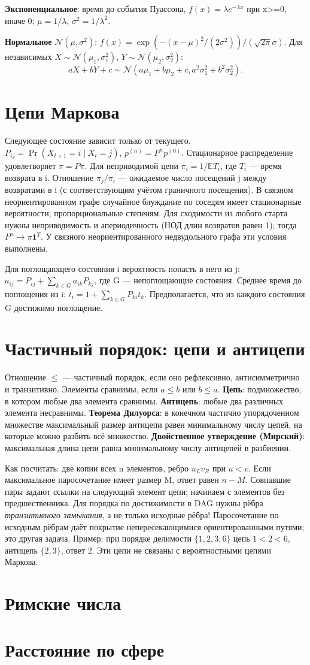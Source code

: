 \textbf{Экспоненциальное}: время до события Пуассона,
$f(x)=\lambda e^{-\lambda x}$ при x>=0, иначе 0;
$\mu=1/\lambda$, $\sigma^2=1/\lambda^2$.

\textbf{Нормальное} $\mathcal N(\mu,\sigma^2)$:
$f(x)=\exp(-(x-\mu)^2/(2\sigma^2))/(\sqrt{2\pi}\sigma)$.
Для независимых $X\sim\mathcal N(\mu_1,\sigma_1^2)$,
$Y\sim\mathcal N(\mu_2,\sigma_2^2)$:
\[aX+bY+c\sim\mathcal N(a\mu_1+b\mu_2+c,a^2\sigma_1^2+b^2\sigma_2^2).\]
\section{Цепи Маркова}
Следующее состояние зависит только от текущего.
$P_{ij}=\Pr(X_{t+1}=i\mid X_t=j)$, $p^{(n)}=P^np^{(0)}$.
Стационарное распределение удовлетворяет $\pi=P\pi$.
Для неприводимой цепи $\pi_i=1/\mathbb ET_i$, где $T_i$ — время
возврата в i. Отношение $\pi_j/\pi_i$ — ожидаемое число посещений j
между возвратами в i (с соответствующим учётом граничного посещения).
В связном неориентированном графе случайное блуждание по соседям
имеет стационарные вероятности, пропорциональные степеням.
Для сходимости из любого старта нужны неприводимость и
апериодичность (НОД длин возвратов равен 1);
тогда $P^n\to\pi\mathbf1^T$. У связного неориентированного
недвудольного графа эти условия выполнены.

Для поглощающего состояния i вероятность попасть в него из j:
$a_{ij}=P_{ij}+\sum_{k\in G}a_{ik}P_{kj}$,
где G — непоглощающие состояния.
Среднее время до поглощения из i:
$t_i=1+\sum_{k\in G}P_{ki}t_k$.
Предполагается, что из каждого состояния G достижимо поглощение.

\section{Частичный порядок: цепи и антицепи}
Отношение $\le$ — частичный порядок, если оно рефлексивно,
антисимметрично и транзитивно. Элементы сравнимы, если $a\le b$
или $b\le a$.
\textbf{Цепь}: подмножество, в котором любые два элемента сравнимы.
\textbf{Антицепь}: любые два различных элемента несравнимы.
\textbf{Теорема Дилуорса}: в конечном частично упорядоченном множестве
максимальный размер антицепи равен минимальному числу цепей,
на которые можно разбить всё множество.
\textbf{Двойственное утверждение (Мирский)}: максимальная длина цепи
равна минимальному числу антицепей в разбиении.

Как посчитать: две копии всех n элементов, ребро $u_Lv_R$ при $u<v$.
Если максимальное паросочетание имеет размер M, ответ равен $n-M$.
Совпавшие пары задают ссылки на следующий элемент цепи; начинаем
с элементов без предшественника.
Для порядка по достижимости в DAG нужны рёбра \emph{транзитивного
замыкания}, а не только исходные рёбра! Паросочетание по исходным
рёбрам даёт покрытие непересекающимися ориентированными путями;
это другая задача. Пример: при порядке делимости
$\{1,2,3,6\}$ цепь $1<2<6$, антицепь $\{2,3\}$, ответ 2.
Эти цепи не связаны с вероятностными цепями Маркова.

\section{Римские числа}

\section{Расстояние по сфере}
\begingroup
{}
\endgroup
